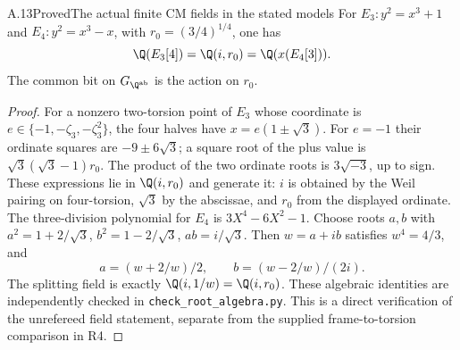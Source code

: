 \begin{statement}{A.13}{Proved}{The actual finite CM fields in the stated models}
For $E_3:y^2=x^3+1$ and $E_4:y^2=x^3-x$, with
$r_0=(3/4)^{1/4}$, one has
\[
 \Q(E_3[4])=\Q(i,r_0)=\Q(x(E_4[3])).
\]
The common bit on $G_{\Q^{\rm ab}}$ is the action on $r_0$.
\end{statement}
\begin{proof}
For a nonzero two-torsion point of $E_3$ whose coordinate is
$e\in\{-1,-\zeta_3,-\zeta_3^2\}$, the four halves have
$x=e(1\pm\sqrt3)$. For $e=-1$ their ordinate squares
are $-9\pm6\sqrt3$; a square root of the plus value is
$\sqrt3(\sqrt3-1)r_0$. The product of the two ordinate
roots is $3\sqrt{-3}$, up to sign. These expressions lie
in $\Q(i,r_0)$ and generate it: $i$ is obtained by the
Weil pairing on four-torsion, $\sqrt3$ by the abscissae,
and $r_0$ from the displayed ordinate.
The three-division polynomial for $E_4$ is
$3X^4-6X^2-1$. Choose roots $a,b$ with
$a^2=1+2/\sqrt3$, $b^2=1-2/\sqrt3$, $ab=i/\sqrt3$.
Then $w=a+ib$ satisfies $w^4=4/3$, and
\[
 a=(w+2/w)/2,\qquad b=(w-2/w)/(2i).
\]
The splitting field is exactly $\Q(i,1/w)=\Q(i,r_0)$.
These algebraic identities are independently checked in
\texttt{check\_root\_algebra.py}. This is a direct verification
of the unrefereed field statement, separate from the supplied
frame-to-torsion comparison in R4.
\end{proof}

